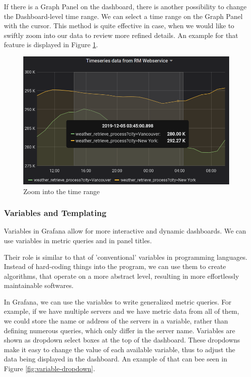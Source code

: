 If there is a Graph Panel on the dashboard, there is another possibility to change the Dashboard-level time range. We can select a time range on the Graph Panel with the cursor. This method is quite effective in case, when we would like to swiftly zoom into our data to review more refined details. An example for that feature is displayed in Figure \ref{fig:select-time}.

\begin{figure}[h]
	\centering
	\includegraphics[width=130mm, keepaspectratio]{figures/select-time.png}
	\caption{Zoom into the time range}
	\label{fig:select-time}
\end{figure}

\subsubsection{Variables and Templating}

Variables in Grafana allow for more interactive and dynamic dashboards. We can use variables in metric queries and in panel titles.

Their role is similar to that of 'conventional' variables in programming languages. Instead of hard-coding things into the program, we can use them to create algorithms, that operate on a more abstract level, resulting in more effortlessly maintainable softwares.

In Grafana, we can use the variables to write generalized metric queries. For example, if we have multiple servers and we have metric data from all of them, we could store the name or address of the servers in a variable, rather than defining numerous queries, which only differ in the server name. Variables are shown as dropdown select boxes at the top of the dashboard. These dropdowns make it easy to change the value of each available variable, thus to adjust the data being displayed in the dashboard. An example of that can bee seen in Figure \ref{fig:variable-dropdown}.

